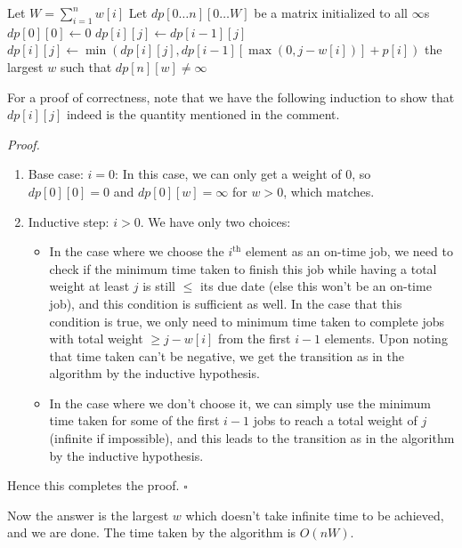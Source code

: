 \documentclass[a4paper]{article}
\newenvironment{proof}{\begin{breakbox}\textit{Proof.}}{\hfill$\square$\end{breakbox}}
\newcommand{\nl}{\vspace{0.2cm}\\}
\begin{document}
\begin{algorithmic}[1]
        \State Let $W = \sum_{i = 1}^n w[i]$
        \State Let $dp[0 \ldots n][0 \ldots W]$ be a matrix initialized to all $\infty$s
        \State $dp[0][0] \gets 0$
                \State $dp[i][j] \gets dp[i - 1][j]$
                    \State $dp[i][j] \gets \min(dp[i][j], dp[i - 1][\max(0, j - w[i])] + p[i])$
                \EndIf
            \EndFor
        \EndFor
        \State \Return the largest $w$ such that $dp[n][w] \ne \infty$ 
    \EndFunction
\end{algorithmic}
For a proof of correctness, note that we have the following induction to show that $dp[i][j]$ indeed is the quantity mentioned in the comment.
\begin{proof}
    \begin{enumerate}
        \item Base case: $i = 0$: In this case, we can only get a weight of $0$, so $dp[0][0] = 0$ and $dp[0][w] = \infty$ for $w > 0$, which matches.
        \item Inductive step: $i > 0$. We have only two choices:
            \begin{itemize}
                \item In the case where we choose the $i^\mathrm{th}$ element as an on-time job, we need to check if the minimum time taken to finish this job while having a total weight at
                    least $j$ is still $\le$ its due date (else this won't be an on-time job), and this condition is sufficient as well. In the case that this condition is true, we only need to
                    minimum time taken to complete jobs with total weight $\ge j - w[i]$ from the first $i - 1$ elements. Upon noting that time taken can't be negative, we get the transition as in
                    the algorithm by the inductive hypothesis.
                \item In the case where we don't choose it, we can simply use the minimum time taken for some of the first $i - 1$ jobs to reach a total weight of $j$ (infinite if impossible),
                    and this leads to the transition as in the algorithm by the inductive hypothesis.
            \end{itemize}
    \end{enumerate}
    Hence this completes the proof.
\end{proof}
Now the answer is the largest $w$ which doesn't take infinite time to be achieved, and we are done. The time taken by the algorithm is $O(nW)$.\nl
\end{document}
